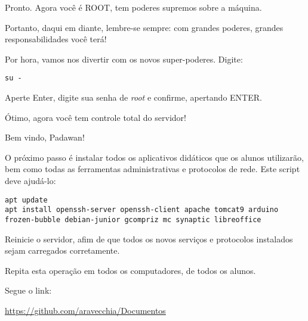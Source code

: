 \begin{multicols}{2}
Pronto. Agora você é ROOT, tem poderes supremos sobre a máquina.

Portanto, daqui em diante, lembre-se sempre: com grandes poderes, grandes responsabilidades você terá!

Por hora, vamos nos divertir com os novos super-poderes. Digite:

\begin{lstlisting}
su -
\end{lstlisting}

Aperte Enter, digite sua senha de \textit{root} e confirme, apertando ENTER.

Ótimo, agora você tem controle total do servidor!

Bem vindo, Padawan!

O próximo passo é instalar todos os aplicativos didáticos que os alunos utilizarão, bem como todas as ferramentas administrativas e protocolos de rede. Este script deve ajudá-lo:

\begin{lstlisting}
apt update
apt install openssh-server openssh-client apache tomcat9 arduino frozen-bubble debian-junior gcompriz mc synaptic libreoffice
\end{lstlisting}

Reinicie o servidor, afim de que todos os novos serviços e protocolos instalados sejam carregados corretamente.

Repita esta operação em todos os computadores, de todos os alunos.

Segue o link:
\end{multicols}
\begin{center}
	\Huge	\href{https://github.com/aravecchia/Documentos}{https://github.com/aravecchia/Documentos}
\end{center}
\null\vfill\pagebreak


